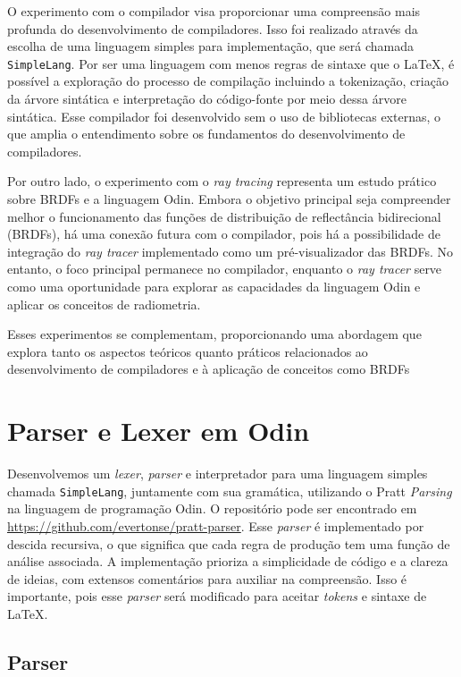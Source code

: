 \documentclass[english, 
               brazil, 
               bsc] %
               {dcomp-abntex2}
\begin{document}
O experimento com o compilador visa proporcionar uma compreensão mais profunda  do desenvolvimento de compiladores. Isso foi realizado através da escolha de uma linguagem simples para implementação, que será chamada \texttt{SimpleLang}. Por ser uma linguagem com menos regras de sintaxe que o \LaTeX, é possível a exploração do processo de compilação incluindo a tokenização, criação da árvore sintática e interpretação do código-fonte por meio dessa árvore sintática. Esse compilador foi desenvolvido sem o uso de bibliotecas externas, o que amplia o entendimento sobre os fundamentos do desenvolvimento de compiladores.




Por outro lado, o experimento com o \textit{ray tracing} representa um estudo prático sobre BRDFs e a linguagem Odin. Embora o objetivo principal seja compreender melhor o funcionamento das funções de distribuição de reflectância bidirecional (BRDFs), há uma conexão futura com o compilador, pois há a possibilidade de integração do \textit{ray tracer} implementado como um pré-visualizador das BRDFs. No entanto, o foco principal permanece no compilador, enquanto o \textit{ray tracer} serve como uma oportunidade para explorar as capacidades da linguagem Odin e aplicar os conceitos de radiometria.


Esses experimentos se complementam, proporcionando uma abordagem que explora tanto os aspectos teóricos quanto práticos relacionados ao desenvolvimento de compiladores e à aplicação de conceitos como BRDFs


\section{Parser e Lexer em Odin}\label{parser}


Desenvolvemos um \textit{lexer}, \textit{parser} e interpretador para uma linguagem simples chamada \texttt{SimpleLang}, juntamente com sua gramática, utilizando o Pratt \textit{Parsing} na linguagem de programação Odin. O repositório pode ser encontrado em \url{https://github.com/evertonse/pratt-parser}. Esse \textit{parser} é implementado por descida recursiva, o que significa que cada regra de produção tem uma função de análise associada. A implementação prioriza a simplicidade de código e a clareza de ideias, com extensos comentários para auxiliar na compreensão. Isso é importante, pois esse \textit{parser} será modificado para aceitar \textit{tokens} e sintaxe de \LaTeX.


\subsection{Parser}
\end{document}
